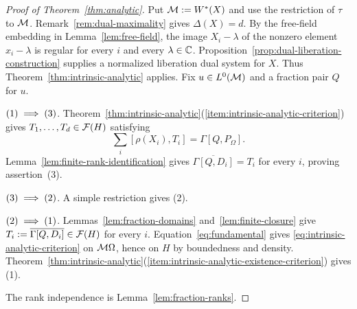 \begin{proof}[Proof of Theorem~\ref{thm:analytic}]
Put $\mathcal M:=W^*(X)$ and use the restriction of $\tau$ to $\mathcal M$.
Remark~\ref{rem:dual-maximality} gives $\Delta(X)=d$.
By the free-field embedding in Lemma~\ref{lem:free-field}, the image $X_i-\lambda$ of the nonzero element $x_i-\lambda$ is regular for every $i$ and every $\lambda\in\mathbb C$.
Proposition~\ref{prop:dual-liberation-construction} supplies a normalized liberation dual system for $X$.
Thus Theorem~\ref{thm:intrinsic-analytic} applies.
Fix $u\in L^0(\mathcal M)$ and a fraction pair $Q$ for $u$.

$\textup{(1)}\implies\textup{(3)}$.
Theorem~\ref{thm:intrinsic-analytic}\textup{(\ref{item:intrinsic-analytic-criterion})} gives $T_1,\ldots,T_d\in\mathcal F(H)$ satisfying
\[
 \sum_i[\rho(X_i),T_i]=\Gamma[Q,P_\Omega].
\]
Lemma~\ref{lem:finite-rank-identification} gives $\overline{\Gamma[Q,D_i]}=T_i$ for every $i$, proving assertion~\textup{(3)}.

$\textup{(3)}\implies\textup{(2)}$.
A simple restriction gives \textup{(2)}.

$\textup{(2)}\implies\textup{(1)}$.
Lemmas~\ref{lem:fraction-domains} and~\ref{lem:finite-closure} give $T_i:=\overline{\Gamma[Q,D_i]}\in\mathcal F(H)$ for every $i$.
Equation~\eqref{eq:fundamental} gives \eqref{eq:intrinsic-analytic-criterion} on $\mathcal M\Omega$, hence on $H$ by boundedness and density.
Theorem~\ref{thm:intrinsic-analytic}\textup{(\ref{item:intrinsic-analytic-existence-criterion})} gives \textup{(1)}.

The rank independence is Lemma~\ref{lem:fraction-ranks}.
\end{proof}

